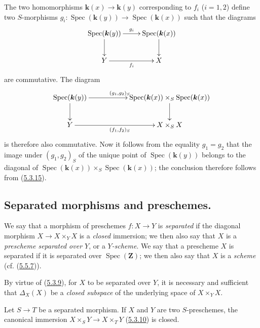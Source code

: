 The two homomorphisms $\boldsymbol{k}(x)\to\boldsymbol{k}(y)$ corresponding to $f_i$ ($i=1,2$)
define two $S$-morphisms
$g_i:\operatorname{Spec}(\boldsymbol{k}(y))\to\operatorname{Spec}(\boldsymbol{k}(x))$ such that the
diagrams
\[
  \xymatrix{
    \operatorname{Spec}(\boldsymbol{k}(y))\ar[r]^{g_i}\ar[d] &
    \operatorname{Spec}(\boldsymbol{k}(x))\ar[d]\\
    Y\ar[r]_{f_i} & X
  }
\]
are commutative. The diagram
\[
  \xymatrix{
    \operatorname{Spec}(\boldsymbol{k}(y))\ar[rr]^{(g_1,g_2)_S}\ar[d] & &
    \operatorname{Spec}(\boldsymbol{k}(x))\times_S\operatorname{Spec}(\boldsymbol{k}(x))\ar[d]\\
    Y\ar[rr]_{(f_1,f_2)_S} & & X\times_S X
  }
\]
is therefore also commutative. Now it follows from the equality $g_1=g_2$
that the image under $(g_1,g_2)_S$ of the unique point of
$\operatorname{Spec}(\boldsymbol{k}(y))$ belongs to the diagonal of
$\operatorname{Spec}(\boldsymbol{k}(x))\times_S\operatorname{Spec}(\boldsymbol{k}(x))$; the conclusion
therefore follows from (\hyperref[I.5.3.15]{5.3.15}).

\subsection{Separated morphisms and preschemes.}
\label{subsection:I.5.4}

\begin{definition}[5.4.1]
\label{I.5.4.1}
We say that a morphism of preschemes $f:X\to Y$ is \emph{separated} if the
diagonal morphism $X\to X\times_Y X$ is a \emph{closed} immersion; we
then also say that $X$ is a \emph{prescheme separated over $Y$}, or a
\emph{$Y$-scheme}. We say that a prescheme $X$ is separated if it is
separated over $\operatorname{Spec}(\mathbf{Z})$; we then also say that $X$
is a \emph{scheme} (cf. (\hyperref[I.5.5.7]{5.5.7})).
\end{definition}

By virtue of (\hyperref[I.5.3.9]{5.3.9}), for $X$ to be separated over
$Y$, it is necessary and sufficient that $\Delta_X(X)$ be a \emph{closed
subspace} of the underlying space of $X\times_Y X$.

\begin{proposition}[5.4.2]
\label{I.5.4.2}
Let $S\to T$ be a separated morphism. If $X$ and $Y$ are two $S$-preschemes,
the canonical immersion $X\times_S Y\to X\times_T Y$
\textup{(\hyperref[I.5.3.10]{5.3.10})} is closed.
\end{proposition}

